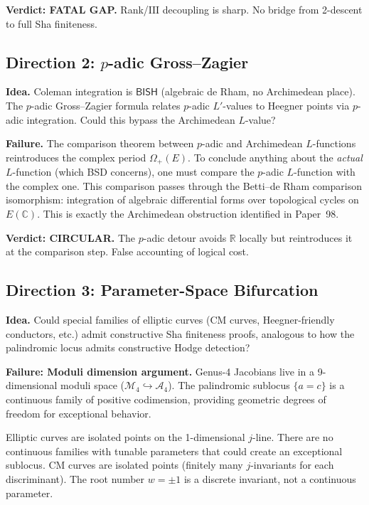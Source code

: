 \documentclass[11pt,a4paper]{article}
\theoremstyle{plain}
\theoremstyle{definition}
\newcommand{\BISH}{\textsf{BISH}}
\newcommand{\Sha}{\mathrm{III}}
\begin{document}
\textbf{Verdict: FATAL GAP.} Rank/$\Sha$ decoupling is sharp. No bridge from 2-descent to full Sha finiteness.

\subsection{Direction 2: $p$-adic Gross--Zagier}

\textbf{Idea.} Coleman integration is $\BISH$ (algebraic de Rham, no Archimedean place). The $p$-adic Gross--Zagier formula relates $p$-adic $L'$-values to Heegner points via $p$-adic integration. Could this bypass the Archimedean $L$-value?

\textbf{Failure.} The comparison theorem between $p$-adic and Archimedean $L$-functions reintroduces the complex period $\Omega_+(E)$. To conclude anything about the \emph{actual} $L$-function (which BSD concerns), one must compare the $p$-adic $L$-function with the complex one. This comparison passes through the Betti--de Rham comparison isomorphism: integration of algebraic differential forms over topological cycles on $E(\mathbb{C})$. This is exactly the Archimedean obstruction identified in Paper~98.

\textbf{Verdict: CIRCULAR.} The $p$-adic detour avoids $\mathbb{R}$ locally but reintroduces it at the comparison step. False accounting of logical cost.

\subsection{Direction 3: Parameter-Space Bifurcation}

\textbf{Idea.} Could special families of elliptic curves (CM curves, Heegner-friendly conductors, etc.) admit constructive Sha finiteness proofs, analogous to how the palindromic locus admits constructive Hodge detection?

\textbf{Failure: Moduli dimension argument.} Genus-4 Jacobians live in a 9-dimensional moduli space ($\mathcal{M}_4 \hookrightarrow \mathcal{A}_4$). The palindromic sublocus $\{a = c\}$ is a continuous family of positive codimension, providing geometric degrees of freedom for exceptional behavior.

Elliptic curves are isolated points on the 1-dimensional $j$-line. There are no continuous families with tunable parameters that could create an exceptional sublocus. CM curves are isolated points (finitely many $j$-invariants for each discriminant). The root number $w = \pm 1$ is a discrete invariant, not a continuous parameter.
\end{document}
